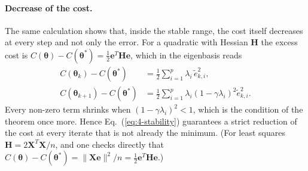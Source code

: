 \paragraph{Decrease of the cost.}
The same calculation shows that, inside the stable range, the cost itself
decreases at every step and not only the error.  For a quadratic with
Hessian $\bm{H}$ the excess cost is
$C(\bm{\theta})-C(\bm{\theta}^{*})=\tfrac12\bm{e}^{T}\bm{H}\bm{e}$, which
in the eigenbasis reads
\begin{align}
  C(\bm{\theta}_k)-C(\bm{\theta}^{*})
   &= \frac12\sum_{i=1}^{p}\lambda_i\,\tilde{e}_{k,i}^{2},
  \nonumber\\
  C(\bm{\theta}_{k+1})-C(\bm{\theta}^{*})
   &= \frac12\sum_{i=1}^{p}\lambda_i\left(1-\gamma\lambda_i\right)^{2}
     \tilde{e}_{k,i}^{2} .
  \label{eq:4-lossmodes}
\end{align}
Every non-zero term shrinks when $(1-\gamma\lambda_i)^{2}<1$, which is the
condition of the theorem once more.  Hence Eq.~(\ref{eq:4-stability})
guarantees a strict reduction of the cost at every iterate that is not
already the minimum.  (For least squares $\bm{H}=2\bm{X}^{T}\bm{X}/n$, and
one checks directly that
$C(\bm{\theta})-C(\bm{\theta}^{*})=\|\bm{X}\bm{e}\|^{2}/n
=\tfrac12\bm{e}^{T}\bm{H}\bm{e}$.)

